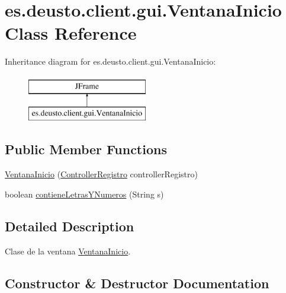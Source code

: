 \hypertarget{classes_1_1deusto_1_1client_1_1gui_1_1_ventana_inicio}{}\section{es.\+deusto.\+client.\+gui.\+Ventana\+Inicio Class Reference}
\label{classes_1_1deusto_1_1client_1_1gui_1_1_ventana_inicio}
Inheritance diagram for es.\+deusto.\+client.\+gui.\+Ventana\+Inicio\+:\begin{figure}[H]
\begin{center}
\leavevmode
\includegraphics[height=2.000000cm]{classes_1_1deusto_1_1client_1_1gui_1_1_ventana_inicio}
\end{center}
\end{figure}
\subsection*{Public Member Functions}
\begin{DoxyCompactItemize}
\item 
\mbox{\hyperlink{classes_1_1deusto_1_1client_1_1gui_1_1_ventana_inicio_a33f182305480b08b08d9fc24734c0d10}{Ventana\+Inicio}} (\mbox{\hyperlink{classes_1_1deusto_1_1client_1_1controllers_1_1_controller_registro}{Controller\+Registro}} controller\+Registro)
\item 
boolean \mbox{\hyperlink{classes_1_1deusto_1_1client_1_1gui_1_1_ventana_inicio_aa38485833a71523202d9dfbcc788db10}{contiene\+Letras\+Y\+Numeros}} (String s)
\end{DoxyCompactItemize}


\subsection{Detailed Description}
Clase de la ventana \mbox{\hyperlink{classes_1_1deusto_1_1client_1_1gui_1_1_ventana_inicio}{Ventana\+Inicio}}. 

\subsection{Constructor \& Destructor Documentation}
\mbox{\label{classes_1_1deusto_1_1client_1_1gui_1_1_ventana_inicio_a33f182305480b08b08d9fc24734c0d10}} 

